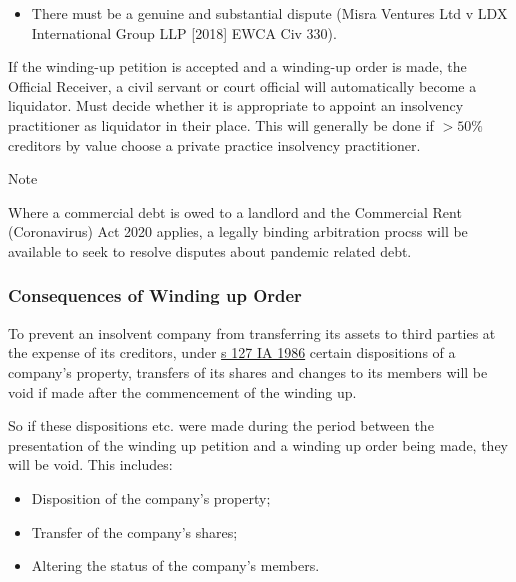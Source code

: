 \documentclass[
]{article}
\providecommand{\tightlist}{%
  \setlength{\itemsep}{0pt}\setlength{\parskip}{0pt}}
\newenvironment{env-440d3209-5a60-4bb6-8a13-881ba9304f97}
{
    \savenotes\tcolorbox[blanker,breakable,left=5pt,borderline west={2pt}{-4pt}{blue}]
}
{
    \endtcolorbox\spewnotes
}
\begin{document}
\begin{itemize}
\tightlist
\item
  There must be a genuine and substantial dispute (Misra Ventures Ltd v
  LDX International Group LLP {[}2018{]} EWCA Civ 330).
\end{itemize}

If the winding-up petition is accepted and a winding-up order is made,
the Official Receiver, a civil servant or court official will
automatically become a liquidator. Must decide whether it is appropriate
to appoint an insolvency practitioner as liquidator in their place. This
will generally be done if {\(> 50\%\)} creditors by value choose a
private practice insolvency practitioner.

\begin{env-440d3209-5a60-4bb6-8a13-881ba9304f97}

Note

Where a commercial debt is owed to a landlord and the Commercial Rent
(Coronavirus) Act 2020 applies, a legally binding arbitration procss
will be available to seek to resolve disputes about pandemic related
debt.

\end{env-440d3209-5a60-4bb6-8a13-881ba9304f97}

\hypertarget{consequences-of-winding-up-order}{%
\subsubsection{Consequences of Winding up
Order}\label{consequences-of-winding-up-order}}

To prevent an insolvent company from transferring its assets to third
parties at the expense of its creditors, under
\href{https://www.legislation.gov.uk/ukpga/1986/45/section/127}{s 127 IA
1986} certain dispositions of a company's property, transfers of its
shares and changes to its members will be void if made after the
commencement of the winding up.

So if these dispositions etc. were made during the period between the
presentation of the winding up petition and a winding up order being
made, they will be void. This includes:

\begin{itemize}
\tightlist
\item
  Disposition of the company's property;
\item
  Transfer of the company's shares;
\item
  Altering the status of the company's members.
\end{itemize}
\end{document}
